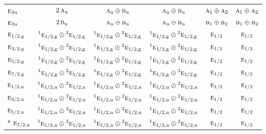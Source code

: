 \documentclass[10pt,a4paper]{article}
\numberwithin{equation}{section}
\newcommand{\irr}[1]{\text{\normalfont\scshape #1}}
\newcommand{\conjpair}[1]{{}^{#1}}
\newcommand{\ptag}[1]{\mathrm{#1}}
\begin{document}
{\begin{longtable}{@{}lccccc@{}}
$\irr{e}_{2\ptag{u}}$ & $2\,\irr{a}_{\ptag{u}}$ & $\irr{a}_{\ptag{u}}\oplus \irr{b}_{\ptag{u}}$ & $\irr{a}_{\ptag{u}}\oplus \irr{b}_{\ptag{u}}$ & $\irr{a}_{1}\oplus \irr{a}_{2}$ & $\irr{a}_{1}\oplus \irr{a}_{2}$\\
$\irr{e}_{3\ptag{u}}$ & $2\,\irr{b}_{\ptag{u}}$ & $\irr{a}_{\ptag{u}}\oplus \irr{b}_{\ptag{u}}$ & $\irr{a}_{\ptag{u}}\oplus \irr{b}_{\ptag{u}}$ & $\irr{b}_{1}\oplus \irr{b}_{2}$ & $\irr{b}_{1}\oplus \irr{b}_{2}$\\
$\irr{e}_{1/2,\ptag{g}}$ & $\conjpair{1}\irr{e}_{1/2,\ptag{g}}\oplus \conjpair{2}\irr{e}_{1/2,\ptag{g}}$ & $\conjpair{1}\irr{e}_{1/2,\ptag{g}}\oplus \conjpair{2}\irr{e}_{1/2,\ptag{g}}$ & $\conjpair{1}\irr{e}_{1/2,\ptag{g}}\oplus \conjpair{2}\irr{e}_{1/2,\ptag{g}}$ & $\irr{e}_{1/2}$ & $\irr{e}_{1/2}$\\
$\irr{e}_{3/2,\ptag{g}}$ & $\conjpair{1}\irr{e}_{1/2,\ptag{g}}\oplus \conjpair{2}\irr{e}_{1/2,\ptag{g}}$ & $\conjpair{1}\irr{e}_{1/2,\ptag{g}}\oplus \conjpair{2}\irr{e}_{1/2,\ptag{g}}$ & $\conjpair{1}\irr{e}_{1/2,\ptag{g}}\oplus \conjpair{2}\irr{e}_{1/2,\ptag{g}}$ & $\irr{e}_{1/2}$ & $\irr{e}_{1/2}$\\
$\irr{e}_{5/2,\ptag{g}}$ & $\conjpair{1}\irr{e}_{1/2,\ptag{g}}\oplus \conjpair{2}\irr{e}_{1/2,\ptag{g}}$ & $\conjpair{1}\irr{e}_{1/2,\ptag{g}}\oplus \conjpair{2}\irr{e}_{1/2,\ptag{g}}$ & $\conjpair{1}\irr{e}_{1/2,\ptag{g}}\oplus \conjpair{2}\irr{e}_{1/2,\ptag{g}}$ & $\irr{e}_{1/2}$ & $\irr{e}_{1/2}$\\
$\irr{e}_{7/2,\ptag{g}}$ & $\conjpair{1}\irr{e}_{1/2,\ptag{g}}\oplus \conjpair{2}\irr{e}_{1/2,\ptag{g}}$ & $\conjpair{1}\irr{e}_{1/2,\ptag{g}}\oplus \conjpair{2}\irr{e}_{1/2,\ptag{g}}$ & $\conjpair{1}\irr{e}_{1/2,\ptag{g}}\oplus \conjpair{2}\irr{e}_{1/2,\ptag{g}}$ & $\irr{e}_{1/2}$ & $\irr{e}_{1/2}$\\
$\irr{e}_{1/2,\ptag{u}}$ & $\conjpair{1}\irr{e}_{1/2,\ptag{u}}\oplus \conjpair{2}\irr{e}_{1/2,\ptag{u}}$ & $\conjpair{1}\irr{e}_{1/2,\ptag{u}}\oplus \conjpair{2}\irr{e}_{1/2,\ptag{u}}$ & $\conjpair{1}\irr{e}_{1/2,\ptag{u}}\oplus \conjpair{2}\irr{e}_{1/2,\ptag{u}}$ & $\irr{e}_{1/2}$ & $\irr{e}_{1/2}$\\
$\irr{e}_{3/2,\ptag{u}}$ & $\conjpair{1}\irr{e}_{1/2,\ptag{u}}\oplus \conjpair{2}\irr{e}_{1/2,\ptag{u}}$ & $\conjpair{1}\irr{e}_{1/2,\ptag{u}}\oplus \conjpair{2}\irr{e}_{1/2,\ptag{u}}$ & $\conjpair{1}\irr{e}_{1/2,\ptag{u}}\oplus \conjpair{2}\irr{e}_{1/2,\ptag{u}}$ & $\irr{e}_{1/2}$ & $\irr{e}_{1/2}$\\
$\irr{e}_{5/2,\ptag{u}}$ & $\conjpair{1}\irr{e}_{1/2,\ptag{u}}\oplus \conjpair{2}\irr{e}_{1/2,\ptag{u}}$ & $\conjpair{1}\irr{e}_{1/2,\ptag{u}}\oplus \conjpair{2}\irr{e}_{1/2,\ptag{u}}$ & $\conjpair{1}\irr{e}_{1/2,\ptag{u}}\oplus \conjpair{2}\irr{e}_{1/2,\ptag{u}}$ & $\irr{e}_{1/2}$ & $\irr{e}_{1/2}$\\*
$\irr{e}_{7/2,\ptag{u}}$ & $\conjpair{1}\irr{e}_{1/2,\ptag{u}}\oplus \conjpair{2}\irr{e}_{1/2,\ptag{u}}$ & $\conjpair{1}\irr{e}_{1/2,\ptag{u}}\oplus \conjpair{2}\irr{e}_{1/2,\ptag{u}}$ & $\conjpair{1}\irr{e}_{1/2,\ptag{u}}\oplus \conjpair{2}\irr{e}_{1/2,\ptag{u}}$ & $\irr{e}_{1/2}$ & $\irr{e}_{1/2}$\\
\bottomrule\end{longtable}}
\end{document}
